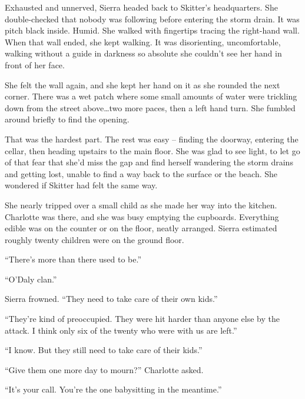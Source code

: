 Exhausted and unnerved, Sierra headed back to Skitter's headquarters.  She double-checked that nobody was following before entering the storm drain.  It was pitch black inside.  Humid.  She walked with fingertips tracing the right-hand wall.  When that wall ended, she kept walking.  It was disorienting, uncomfortable, walking without a guide in darkness so absolute she couldn't see her hand in front of her face.



She felt the wall again, and she kept her hand on it as she rounded the next corner.  There was a wet patch where some small amounts of water were trickling down from the street above\ldots two more paces, then a left hand turn.  She fumbled around briefly to find the opening.



That was the hardest part.  The rest was easy – finding the doorway, entering the cellar, then heading upstairs to the main floor.  She was glad to see light, to let go of that fear that she'd miss the gap and find herself wandering the storm drains and getting lost, unable to find a way back to the surface or the beach.  She wondered if Skitter had felt the same way.



She nearly tripped over a small child as she made her way into the kitchen.  Charlotte was there, and she was busy emptying the cupboards.  Everything edible was on the counter or on the floor, neatly arranged.  Sierra estimated roughly twenty children were on the ground floor.



``There's more than there used to be.''



``O'Daly clan.''



Sierra frowned.  ``They need to take care of their own kids.''



``They're kind of preoccupied.  They were hit harder than anyone else by the attack.  I think only six of the twenty who were with us are left.''



``I know.  But they still need to take care of their kids.''



``Give them one more day to mourn?''  Charlotte asked.



``It's your call.  You're the one babysitting in the meantime.''



